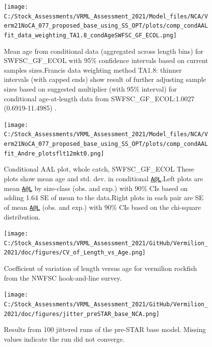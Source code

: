 \documentclass[
  english,
  a4paper,
]{article}
\begin{document}
\begin{figure}
\centering
\texttt{[image: C:/Stock\_Assessments/VRML\_Assessment\_2021/Model\_files/NCA/Verm21NoCA\_077\_proposed\_base\_using\_SS\_OPT/plots/comp\_condAALfit\_data\_weighting\_TA1.8\_condAgeSWFSC\_GF\_ECOL.png]}
\caption{Mean age from conditional data (aggregated across length bins) for SWFSC\_GF\_ECOL with 95\% confidence intervals based on current samples sizes.Francis data weighting method TA1.8: thinner intervals (with capped ends) show result of further adjusting sample sizes based on suggested multiplier (with 95\% interval) for conditional age-at-length data from SWFSC\_GF\_ECOL:1.0027 (0.6919-11.4985) .\label{fig:comp_condAALfit_data_weighting_TA1.8_condAgeSWFSC_GF_ECOL}}
\end{figure}

\begin{figure}
\centering
\texttt{[image: C:/Stock\_Assessments/VRML\_Assessment\_2021/Model\_files/NCA/Verm21NoCA\_077\_proposed\_base\_using\_SS\_OPT/plots/comp\_condAALfit\_Andre\_plotsflt12mkt0.png]}
\caption{Conditional AAL plot, whole catch, SWFSC\_GF\_ECOL
These plots show mean age and std. dev. in conditional \href{mailto:A@L}{\nolinkurl{A@L}}.Left plots are mean \href{mailto:A@L}{\nolinkurl{A@L}} by size-class (obs. and exp.) with 90\% CIs based on adding 1.64 SE of mean to the data.Right plots in each pair are SE of mean \href{mailto:A@L}{\nolinkurl{A@L}} (obs. and exp.) with 90\% CIs based on the chi-square distribution.\label{fig:comp_condAALfit_Andre_plotsflt12mkt0}}
\end{figure}

\FloatBarrier

\FloatBarrier

\begin{figure}
\centering
\texttt{[image: C:/Stock\_Assessments/VRML\_Assessment\_2021/GitHub/Vermilion\_2021/doc/figures/CV\_of\_Length\_vs\_Age.png]}
\caption{Coefficient of variation of length versus age for vermilion rockfish from the NWFSC hook-and-line survey.\label{fig:cv-length-age}}
\end{figure}

\begin{figure}
\centering
\texttt{[image: C:/Stock\_Assessments/VRML\_Assessment\_2021/GitHub/Vermilion\_2021/doc/figures/jitter\_preSTAR\_base\_NCA.png]}
\caption{Results from 100 jittered runs of the pre-STAR base model. Missing values indicate the run did not converge.\label{fig:jitter}}
\end{figure}
\end{document}
